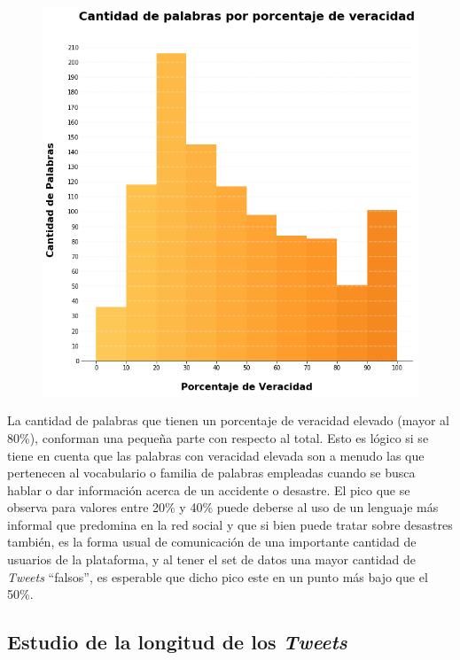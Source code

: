 \documentclass[titlepage,a4paper]{article}
\begin{document}
    \begin{figure}[H]
    \centering
    \includegraphics[width=1\textwidth]{graficos/Analisis Lexico Grafico/cantidad_de_palabras_por_porcentaje_de_veracidad.png}
    \caption{}
    \end{figure}

    La cantidad de palabras que tienen un porcentaje de veracidad elevado (mayor al 80\%), conforman una pequeña parte con respecto al total. Esto es lógico si se tiene en cuenta que las palabras con veracidad elevada son a menudo las que pertenecen al vocabulario o familia de palabras empleadas cuando se busca hablar o dar información acerca de un accidente o desastre. El pico que se observa para valores entre  20\% y  40\% puede deberse al uso de un lenguaje más informal que predomina en la red social y que si bien puede tratar sobre desastres también, es la forma usual de comunicación de una importante cantidad de usuarios de la plataforma, y al tener el set de datos una mayor cantidad de \textit{Tweets} ``falsos'', es esperable que dicho pico este en un punto más bajo que el 50\%. 
    
    \subsection{Estudio de la longitud de los \textit{Tweets}}
\end{document}
